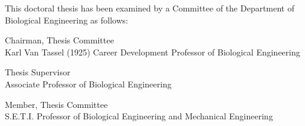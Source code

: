 %
%
%

\begin{titlepage}
\begin{large}
This doctoral thesis has been examined by a Committee of the Department
of Biological Engineering as follows:

\signature{Professor Angela Koehler}{Chairman, Thesis Committee \\
   Karl Van Tassel (1925) Career Development Professor of Biological Engineering}

\signature{Professor Paul C. Blainey}{Thesis Supervisor \\
   Associate Professor of Biological Engineering}

\signature{Professor Linda G. Griffith}{Member, Thesis Committee \\
   S.E.T.I. Professor of Biological Engineering and Mechanical Engineering}
\end{large}
\end{titlepage}

